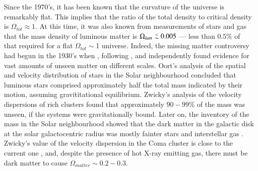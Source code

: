 \documentclass[traditabstract]{aa} %
\newcommand\lesim{\lower.5ex\hbox{$\; \buildrel < \over \sim \;$}}
\begin{document}
Since the 1970's, it has been known that the curvature of the universe
is remarkably flat. This implies that the ratio of the total density
to critical density is $\Omega_{tot} \approx 1$.  At this time, it
was also known from measurements of stars and gas that the mass
density of luminous matter is $\Omega_{lum} \lesim 0.005$ --- less
than $0.5\%$ of that required for a flat $\Omega_{tot}\sim$1 universe.
Indeed, the missing matter controversy had begun in the
1930's when \citet{oort1932}, following \citet{kapteyn1922}, and \citet{zwicky1937} 
independently found
evidence for vast amounts of unseen matter on different scales.
Oort's analysis of the spatial and velocity distribution of stars in the Solar
neighbourhood concluded that luminous stars comprised approximately 
half the total mass indicated by their motion, assuming
gravititational equilibrium.  Zwicky's analysis of the velocity dispersions
of rich clusters found that approximately $90-99\%$ of the mass was unseen, 
if the systems were gravitationally bound. Later on, the
inventory of the mass in the Solar neighbourhood showed that the dark
matter in the galactic disk at the solar galactocentric radius was mostly fainter
stars and interstellar gas \citep[e.g.][]{hf00}. Zwicky's
value of the velocity dispersion in the Coma cluster is close to the
current one \citep[e.g.][]{cd96}, and, despite the presence of hot X-ray 
emitting gas, there must be dark matter to cause $\Omega_{matter} 
\sim 0.2 - 0.3$.
\end{document}
